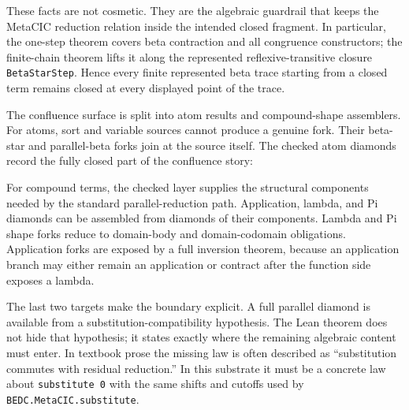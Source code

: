
These facts are not cosmetic.  They are the algebraic guardrail that keeps the
MetaCIC reduction relation inside the intended closed fragment.  In particular,
the one-step theorem covers beta contraction and all congruence constructors;
the finite-chain theorem lifts it along the represented reflexive-transitive
closure \texttt{BetaStarStep}.  Hence every finite represented beta trace
starting from a closed term remains closed at every displayed point of the
trace.

The confluence surface is split into atom results and compound-shape
assemblers.  For atoms, sort and variable sources cannot produce a genuine
fork.  Their beta-star and parallel-beta forks join at the source itself.  The
checked atom diamonds record the fully closed part of the confluence story:


For compound terms, the checked layer supplies the structural components
needed by the standard parallel-reduction path.  Application, lambda, and Pi
diamonds can be assembled from diamonds of their components.  Lambda and Pi
shape forks reduce to domain-body and domain-codomain obligations.  Application
forks are exposed by a full inversion theorem, because an application branch
may either remain an application or contract after the function side exposes a
lambda.


The last two targets make the boundary explicit.  A full parallel diamond is
available from a substitution-compatibility hypothesis.  The Lean theorem does
not hide that hypothesis; it states exactly where the remaining algebraic
content must enter.  In textbook prose the missing law is often described as
``substitution commutes with residual reduction.''  In this substrate it must
be a concrete law about \texttt{substitute 0} with the same shifts and cutoffs
used by \texttt{BEDC.MetaCIC.substitute}.

